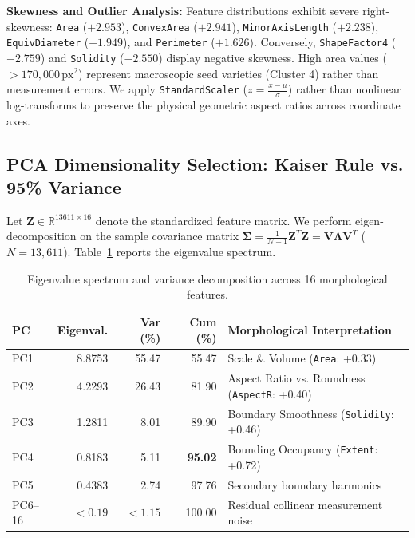 \documentclass[9.5pt,twocolumn,letterpaper]{article}
\newcommand{\R}{\mathbb{R}}
\newcommand{\bZ}{\mathbf{Z}}
\newcommand{\bSigma}{\mathbf{\Sigma}}
\newcommand{\bLambda}{\mathbf{\Lambda}}
\newcommand{\bV}{\mathbf{V}}
\begin{document}
\textbf{Skewness and Outlier Analysis:} Feature distributions exhibit severe right-skewness: \texttt{Area} ($+2.953$), \texttt{ConvexArea} ($+2.941$), \texttt{MinorAxisLength} ($+2.238$), \texttt{EquivDiameter} ($+1.949$), and \texttt{Perimeter} ($+1.626$). Conversely, \texttt{ShapeFactor4} ($-2.759$) and \texttt{Solidity} ($-2.550$) display negative skewness. High area values ($>170{,}000\,\text{px}^2$) represent macroscopic seed varieties (Cluster 4) rather than measurement errors. We apply \texttt{StandardScaler} ($z = \frac{x - \mu}{\sigma}$) rather than nonlinear log-transforms to preserve the physical geometric aspect ratios across coordinate axes.

\subsection{PCA Dimensionality Selection: Kaiser Rule vs. 95\% Variance}
Let $\bZ \in \R^{13611 \times 16}$ denote the standardized feature matrix. We perform eigen-decomposition on the sample covariance matrix $\bSigma = \frac{1}{N-1}\bZ^T\bZ = \bV\bLambda\bV^T$ ($N=13,611$). Table~\ref{tab:pca_variance} reports the eigenvalue spectrum.

\begin{table}[htbp]
\centering
\small
\setlength{\tabcolsep}{3.0pt}
\renewcommand{\arraystretch}{1.08}
\begin{tabularx}{\columnwidth}{l r r r X}
\toprule
\textbf{PC} & \textbf{Eigenval.} & \textbf{Var (\%)} & \textbf{Cum (\%)} & \textbf{Morphological Interpretation} \\
\midrule
PC1 & 8.8753 & 55.47 & 55.47 & Scale \& Volume (\texttt{Area}: +0.33) \\
PC2 & 4.2293 & 26.43 & 81.90 & Aspect Ratio vs. Roundness (\texttt{AspectR}: +0.40) \\
PC3 & 1.2811 & 8.01 & 89.90 & Boundary Smoothness (\texttt{Solidity}: +0.46) \\
PC4 & 0.8183 & 5.11 & \textbf{95.02} & Bounding Occupancy (\texttt{Extent}: +0.72) \\
\midrule
PC5 & 0.4383 & 2.74 & 97.76 & Secondary boundary harmonics \\
PC6--16 & $<0.19$ & $<1.15$ & 100.00 & Residual collinear measurement noise \\
\bottomrule
\end{tabularx}
\caption{Eigenvalue spectrum and variance decomposition across 16 morphological features.}
\label{tab:pca_variance}
\end{table}
\end{document}
